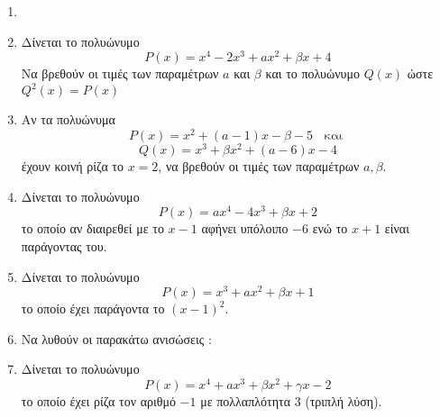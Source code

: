 \documentclass[twoside,nofonts,internet]{askhseis}
\begin{document}

\twocolkentro{\askhseis}
\begin{enumerate}
\item 
\item Δίνεται το πολυώνυμο \[ P(x)=x^4-2x^3+ax^2+\beta x+4 \] Να βρεθούν οι τιμές των παραμέτρων $ a $ και $ \beta $ και το πολυώνυμο $ Q(x) $ ώστε $ Q^2(x)=P(x) $
\item Αν τα πολυώνυμα \[ P(x)=x^2+(a-1)x-\beta-5
\;\;\textrm{ και }\]
\[Q(x) = x^3+\beta x^2+(a-6)x-4 \] έχουν κοινή ρίζα το $ x=2 $, να βρεθούν οι τιμές των παραμέτρων $ a,\beta $.
\item Δίνεται το πολυώνυμο \[ P(x)=ax^4-4x^3+\beta x+2 \] το οποίο αν διαιρεθεί με το $ x-1 $ αφήνει υπόλοιπο $ -6 $ ενώ το $ x+1 $ είναι παράγοντας του.
\item Δίνεται το πολυώνυμο \[ P(x)=x^3+ax^2+\beta x+1 \] το οποίο έχει παράγοντα το $ \left(x-1\right)^2 $.
\newpage
\noindent
\item Να λυθούν οι παρακάτω ανισώσεις :
\item Δίνεται το πολυώνυμο \[ P(x)=x^4+ax^3+\beta x^2+\gamma x-2 \] το οποίο έχει ρίζα τον αριθμό $ -1 $ με πολλαπλότητα 3 (τριπλή λύση).
\end{enumerate}
\end{document}
